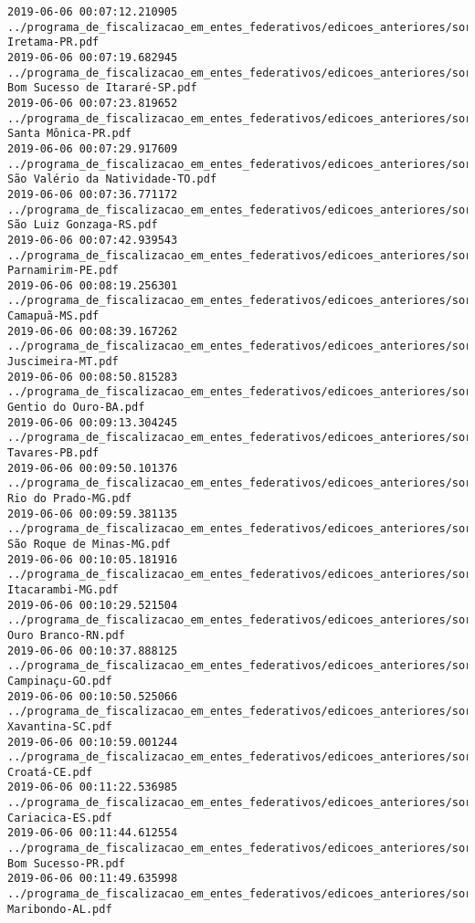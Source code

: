 \begin{lstlisting}
2019-06-06 00:07:12.210905 ../programa_de_fiscalizacao_em_entes_federativos/edicoes_anteriores/sorteio_39/3196-Iretama-PR.pdf
2019-06-06 00:07:19.682945 ../programa_de_fiscalizacao_em_entes_federativos/edicoes_anteriores/sorteio_39/3226-Bom Sucesso de Itararé-SP.pdf
2019-06-06 00:07:23.819652 ../programa_de_fiscalizacao_em_entes_federativos/edicoes_anteriores/sorteio_39/3198-Santa Mônica-PR.pdf
2019-06-06 00:07:29.917609 ../programa_de_fiscalizacao_em_entes_federativos/edicoes_anteriores/sorteio_39/3238-São Valério da Natividade-TO.pdf
2019-06-06 00:07:36.771172 ../programa_de_fiscalizacao_em_entes_federativos/edicoes_anteriores/sorteio_39/3216-São Luiz Gonzaga-RS.pdf
2019-06-06 00:07:42.939543 ../programa_de_fiscalizacao_em_entes_federativos/edicoes_anteriores/sorteio_39/3188-Parnamirim-PE.pdf
2019-06-06 00:08:19.256301 ../programa_de_fiscalizacao_em_entes_federativos/edicoes_anteriores/sorteio_39/3170-Camapuã-MS.pdf
2019-06-06 00:08:39.167262 ../programa_de_fiscalizacao_em_entes_federativos/edicoes_anteriores/sorteio_39/3172-Juscimeira-MT.pdf
2019-06-06 00:08:50.815283 ../programa_de_fiscalizacao_em_entes_federativos/edicoes_anteriores/sorteio_39/3130-Gentio do Ouro-BA.pdf
2019-06-06 00:09:13.304245 ../programa_de_fiscalizacao_em_entes_federativos/edicoes_anteriores/sorteio_39/3182-Tavares-PB.pdf
2019-06-06 00:09:50.101376 ../programa_de_fiscalizacao_em_entes_federativos/edicoes_anteriores/sorteio_39/3166-Rio do Prado-MG.pdf
2019-06-06 00:09:59.381135 ../programa_de_fiscalizacao_em_entes_federativos/edicoes_anteriores/sorteio_39/3168-São Roque de Minas-MG.pdf
2019-06-06 00:10:05.181916 ../programa_de_fiscalizacao_em_entes_federativos/edicoes_anteriores/sorteio_39/3164-Itacarambi-MG.pdf
2019-06-06 00:10:29.521504 ../programa_de_fiscalizacao_em_entes_federativos/edicoes_anteriores/sorteio_39/3206-Ouro Branco-RN.pdf
2019-06-06 00:10:37.888125 ../programa_de_fiscalizacao_em_entes_federativos/edicoes_anteriores/sorteio_39/3148-Campinaçu-GO.pdf
2019-06-06 00:10:50.525066 ../programa_de_fiscalizacao_em_entes_federativos/edicoes_anteriores/sorteio_39/3220-Xavantina-SC.pdf
2019-06-06 00:10:59.001244 ../programa_de_fiscalizacao_em_entes_federativos/edicoes_anteriores/sorteio_39/3136-Croatá-CE.pdf
2019-06-06 00:11:22.536985 ../programa_de_fiscalizacao_em_entes_federativos/edicoes_anteriores/sorteio_39/3144-Cariacica-ES.pdf
2019-06-06 00:11:44.612554 ../programa_de_fiscalizacao_em_entes_federativos/edicoes_anteriores/sorteio_39/3194-Bom Sucesso-PR.pdf
2019-06-06 00:11:49.635998 ../programa_de_fiscalizacao_em_entes_federativos/edicoes_anteriores/sorteio_39/3124-Maribondo-AL.pdf

\end{lstlisting}
